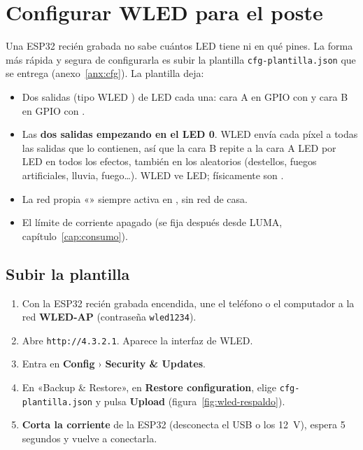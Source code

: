 \chapter{Configurar WLED para el poste}\label{cap:wled}

Una ESP32 recién grabada no sabe cuántos LED tiene ni en qué pines. La forma más rápida y segura de configurarla es subir la plantilla \texttt{cfg-plantilla.json} que se entrega (anexo~\ref{anx:cfg}). La plantilla deja:

\begin{itemize}
\item Dos salidas  (tipo WLED ) de  LED cada una: cara A en GPIO con  y cara B en GPIO con .
\item Las \textbf{dos salidas empezando en el LED 0}. WLED envía cada píxel a todas las salidas que lo contienen, así que la cara B repite a la cara A LED por LED en todos los efectos, también en los aleatorios (destellos, fuegos artificiales, lluvia, fuego…). WLED ve  LED; físicamente son .
\item La red propia «» siempre activa en \texttt{}, sin red de casa.
\item El límite de corriente apagado (se fija después desde LUMA, capítulo~\ref{cap:consumo}).
\end{itemize}


\section{Subir la plantilla}

\begin{enumerate}
\item Con la ESP32 recién grabada encendida, une el teléfono o el computador a la red \textbf{WLED-AP} (contraseña \texttt{wled1234}).
\item Abre \texttt{http://4.3.2.1}. Aparece la interfaz de WLED.
\item Entra en \textbf{Config} › \textbf{Security \& Updates}.
\item En «Backup \& Restore», en \textbf{Restore configuration}, elige \texttt{cfg-plantilla.json} y pulsa \textbf{Upload} (figura~\ref{fig:wled-respaldo}).
\item \textbf{Corta la corriente} de la ESP32 (desconecta el USB o los 12~V), espera 5 segundos y vuelve a conectarla.
\end{enumerate}

